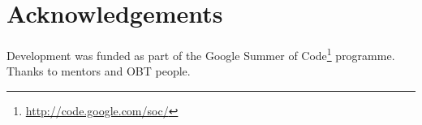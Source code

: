 \documentclass[11pt]{article}
\begin{document}
\section{Acknowledgements}
\label{sec-6}

Development was funded as part of the Google Summer of Code\footnote{\href{http://code.google.com/soc/}{http://code.google.com/soc/} }
programme. Thanks to mentors and OBT people.



\end{document}
